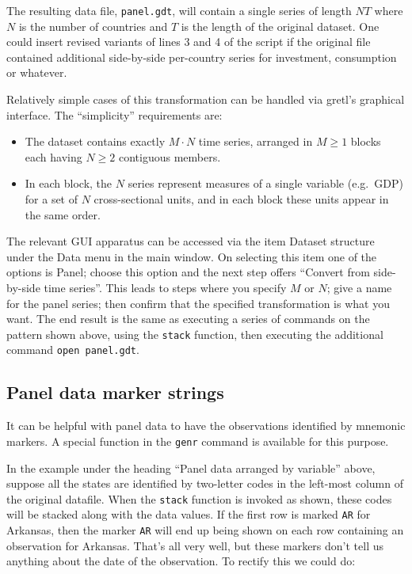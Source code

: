 
The resulting data file, \texttt{panel.gdt}, will contain a single
series of length $NT$ where $N$ is the number of countries and
$T$ is the length of the original dataset. One could insert revised
variants of lines 3 and 4 of the script if the original file contained
additional side-by-side per-country series for investment, consumption
or whatever.

Relatively simple cases of this transformation can be handled
via gretl's graphical interface. The ``simplicity'' requirements are:
\begin{itemize}
\item The dataset contains exactly $M \cdot N$ time series, arranged
  in $M $ blocks each having $N $ contiguous members.
\item In each block, the $N$ series represent measures of a single
  variable (e.g.\ GDP) for a set of $N$ cross-sectional units, and in
  each block these units appear in the same order.
\end{itemize}
The relevant GUI apparatus can be accessed via the item
\textsf{Dataset structure} under the \textsf{Data} menu in the main
window.  On selecting this item one of the options is \textsf{Panel};
choose this option and the next step offers ``Convert from
side-by-side time series''. This leads to steps where you specify $M$
or $N$; give a name for the panel series; then confirm that the
specified transformation is what you want. The end result is the same
as executing a series of commands on the pattern shown above, using
the \texttt{stack} function, then executing the additional command
\texttt{open panel.gdt}.

\subsection{Panel data marker strings}

It can be helpful with panel data to have the observations identified
by mnemonic markers.  A special function in the \texttt{genr} command
is available for this purpose.

In the example under the heading ``Panel data arranged by variable''
above, suppose all the states are identified by two-letter codes in
the left-most column of the original datafile.  When the
\texttt{stack} function is invoked as shown, these codes will be
stacked along with the data values.  If the first row is marked
\texttt{AR} for Arkansas, then the marker \texttt{AR} will end up
being shown on each row containing an observation for Arkansas.
That's all very well, but these markers don't tell us anything about
the date of the observation.  To rectify this we could do:

